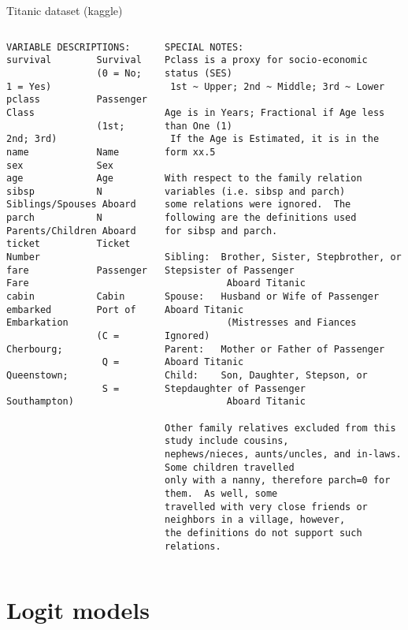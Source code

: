\documentclass[presentation]{beamer}
\begin{document}
\begin{frame}[fragile,label={sec:orgbe7c938}]{Titanic dataset (kaggle)}
 \begin{columns}
\begin{column}{.37\columnwidth}
\begin{tiny}

\begin{verbatim}
VARIABLE DESCRIPTIONS:
survival        Survival
                (0 = No; 1 = Yes)
pclass          Passenger Class
                (1st; 2nd; 3rd)
name            Name
sex             Sex
age             Age
sibsp           N Siblings/Spouses Aboard
parch           N Parents/Children Aboard
ticket          Ticket Number
fare            Passenger Fare
cabin           Cabin
embarked        Port of Embarkation
                (C = Cherbourg; 
                 Q = Queenstown; 
                 S = Southampton)
\end{verbatim}

\end{tiny}
\end{column}

\begin{column}{.63\columnwidth}
\begin{tiny}

\begin{verbatim}
SPECIAL NOTES:
Pclass is a proxy for socio-economic status (SES)
 1st ~ Upper; 2nd ~ Middle; 3rd ~ Lower

Age is in Years; Fractional if Age less than One (1)
 If the Age is Estimated, it is in the form xx.5

With respect to the family relation variables (i.e. sibsp and parch)
some relations were ignored.  The following are the definitions used
for sibsp and parch.

Sibling:  Brother, Sister, Stepbrother, or Stepsister of Passenger 
           Aboard Titanic
Spouse:   Husband or Wife of Passenger Aboard Titanic 
           (Mistresses and Fiances Ignored)
Parent:   Mother or Father of Passenger Aboard Titanic
Child:    Son, Daughter, Stepson, or Stepdaughter of Passenger 
           Aboard Titanic

Other family relatives excluded from this study include cousins,
nephews/nieces, aunts/uncles, and in-laws.  Some children travelled
only with a nanny, therefore parch=0 for them.  As well, some
travelled with very close friends or neighbors in a village, however,
the definitions do not support such relations.
\end{verbatim}

\end{tiny}
\end{column}
\end{columns}
\end{frame}



\section*{Logit models}
\label{sec:org9e628b0}
\end{document}
